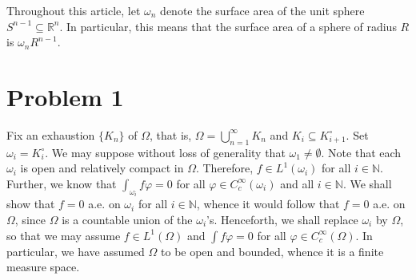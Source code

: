 \documentclass[10pt]{amsart}
\theoremstyle{thmstyle}
\theoremstyle{defstyle}
\newcommand{\R}{\mathbb{R}}
\newcommand{\N}{\mathbb{N}}
\begin{document}
Throughout this article, let $\omega_n$ denote the surface area of the unit sphere $S^{n - 1}\subseteq\R^{n}$. In particular, this means that the surface area of a sphere of radius $R$ is $\omega_n R^{n - 1}$.

\section{Problem 1}

Fix an exhaustion $\{K_n\}$ of $\Omega$, that is, $\Omega = \bigcup_{n = 1}^\infty K_n$ and $K_i\subseteq K_{i + 1}^\circ$. Set $\omega_i = K_{i}^\circ$. We may suppose without loss of generality that $\omega_1\ne\emptyset$. Note that each $\omega_i$ is open and relatively compact in $\Omega$. Therefore, $f\in L^1(\omega_i)$ for all $i\in\N$. Further, we know that $\int_{\omega_i} f\varphi = 0$ for all $\varphi\in C_c^\infty(\omega_i)$ and all $i\in\N$. We shall show that $f = 0$ a.e. on $\omega_i$ for all $i\in\N$, whence it would follow that $f = 0$ a.e. on $\Omega$, since $\Omega$ is a countable union of the $\omega_i$'s. Henceforth, we shall replace $\omega_i$ by $\Omega$, so that we may assume $f\in L^1(\Omega)$ and $\int f\varphi = 0$ for all $\varphi\in C_c^\infty(\Omega)$. In particular, we have assumed $\Omega$ to be open and bounded, whence it is a finite measure space.
\end{document}

